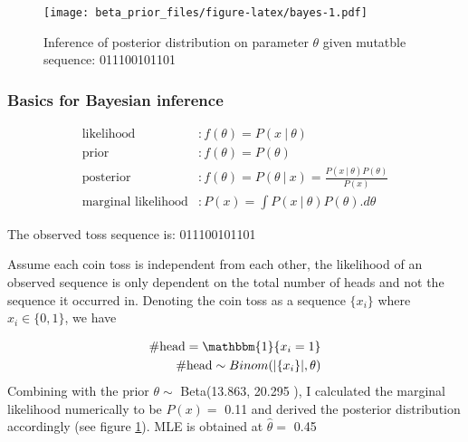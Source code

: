 \documentclass[]{article}
\newcommand{\indicator}{\mathbbm{1}}
\newcommand\gvn[1][]{\:#1\vert\:}
\begin{document}
\begin{figure}
\centering
\texttt{[image: beta\_prior\_files/figure-latex/bayes-1.pdf]}
\caption{\label{fig:bayes}Inference of posterior distribution on parameter
\(\theta\) given mutatble sequence: 011100101101}
\end{figure}

\subsubsection{\texorpdfstring{Basics for Bayesian inference
\label{sec:bayes-basics}}{Basics for Bayesian inference }}\label{basics-for-bayesian-inference}

\[
\begin{aligned}
\text{likelihood}&: f(\theta) = P(x \gvn \theta) \\
\text{prior}&: f(\theta) = P(\theta) \\
\text{posterior}&: f(\theta)  = P(\theta \gvn x) = \frac{  P(x\gvn \theta) P(\theta)  }{P(x) } \\
\text{marginal likelihood} &: P(x) =  \int P(x\gvn \theta) P(\theta).d\theta
\end{aligned}
\]

The observed toss sequence is: 011100101101

Assume each coin toss is independent from each other, the likelihood of
an observed sequence is only dependent on the total number of heads and
not the sequence it occurred in. Denoting the coin toss as a sequence
\(\{x_i\}\) where \(x_i \in \{0,1\}\), we have

\[
\begin{aligned}
\text{\#head} = \indicator\{x_i=1\} \\
\text{\#head} \sim Binom(|\{x_i\}|,\theta)
\end{aligned}
\] Combining with the prior \(\theta\sim\) Beta(13.863, 20.295 ), I
calculated the marginal likelihood numerically to be \(P(x)=\) 0.11 and
derived the posterior distribution accordingly (see figure
\ref{fig:bayes}). MLE is obtained at \(\hat{\theta}=\) 0.45
\end{document}
